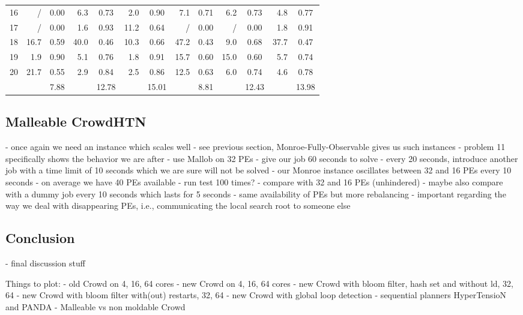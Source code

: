 \begin{table}
\begin{tabular}{|l|rc|rc|rc|rc|rc|rc|}
		16 & / & 0.00 & 6.3 & 0.73 & 2.0 & 0.90 & 7.1 & 0.71 & 6.2 & 0.73 & 4.8 & 0.77\\
		17 & / & 0.00 & 1.6 & 0.93 & 11.2 & 0.64 & / & 0.00 & / & 0.00 & 1.8 & 0.91\\
		18 & 16.7 & 0.59 & 40.0 & 0.46 & 10.3 & 0.66 & 47.2 & 0.43 & 9.0 & 0.68 & 37.7 & 0.47\\
		19 & 1.9 & 0.90 & 5.1 & 0.76 & 1.8 & 0.91 & 15.7 & 0.60 & 15.0 & 0.60 & 5.7 & 0.74\\
		20 & 21.7 & 0.55 & 2.9 & 0.84 & 2.5 & 0.86 & 12.5 & 0.63 & 6.0 & 0.74 & 4.6 & 0.78\\
		\hline
		& & 7.88 & & 12.78 & & 15.01 & & 8.81 & & 12.43 & & 13.98\\
		\hline
	\end{tabular}
\end{table}

\subsection{Malleable CrowdHTN}
\label{eval: malleable}
- once again we need an instance which scales well
- see previous section, Monroe-Fully-Observable gives us such instances
- problem 11 specifically shows the behavior we are after
- use Mallob on 32 PEs
- give our job 60 seconds to solve
- every 20 seconds, introduce another job with a time limit of 10 seconds which we are sure will not be solved
- our Monroe instance oscillates between 32 and 16 PEs every 10 seconds
- on average we have 40 PEs available
- run test 100 times?
- compare with 32 and 16 PEs (unhindered)
- maybe also compare with a dummy job every 10 seconds which lasts for 5 seconds
	- same availability of PEs but more rebalancing
	- important regarding the way we deal with disappearing PEs, i.e., communicating the local search root to someone else

\subsection{Conclusion}
\label{eval: conclusion}
- final discussion stuff

Things to plot:
- old Crowd on 4, 16, 64 cores
- new Crowd on 4, 16, 64 cores
- new Crowd with bloom filter, hash set and without ld, 32, 64
- new Crowd with bloom filter with(out) restarts, 32, 64
- new Crowd with global loop detection
- sequential planners HyperTensioN and PANDA
- Malleable vs non moldable Crowd

